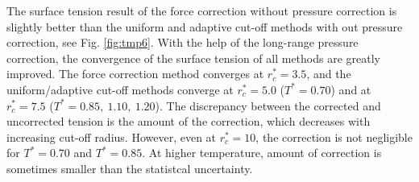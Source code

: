 \documentclass[aps,pre,preprint]{revtex4-1}
\begin{document}
The surface tension result of the force correction without pressure
correction is slightly better than the uniform and adaptive cut-off
methods with out pressure correction, see Fig. \ref{fig:tmp6}.  With
the help of the long-range pressure correction, the convergence of the
surface tension of all methods are greatly improved.  The force
correction method converges at $r_c^\ast = 3.5$, and the
uniform/adaptive cut-off methods converge at $r_c^\ast = 5.0$ ($T^\ast
= 0.70$) and at $r_c^\ast = 7.5$ ($T^\ast = 0.85,\ 1.10,\ 1.20$).  The
discrepancy between the corrected and uncorrected tension is the
amount of the correction, which decreases with increasing cut-off
radius. However, even at $r_c^\ast=10$, the correction is not
negligible for $T^\ast = 0.70$ and $T^\ast = 0.85$. At higher
temperature, amount of correction is sometimes smaller than the
statistcal uncertainty.
\end{document}
